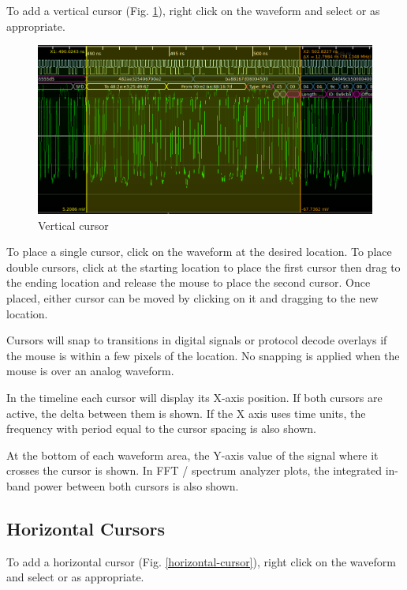 To add a vertical cursor (Fig. \ref{vertical-cursor}), right click on the waveform and select  or  as appropriate.

\begin{figure}[H]
\centering
\includegraphics[width=13cm]{images/vertical-cursor.png}
\caption{Vertical cursor}
\label{vertical-cursor}
\end{figure}

To place a single cursor, click on the waveform at the desired location. To place double cursors, click at the starting
location to place the first cursor then drag to the ending location and release the mouse to place the second cursor.
Once placed, either cursor can be moved by clicking on it and dragging to the new location.

Cursors will snap to transitions in digital signals or protocol decode overlays if the mouse is within a few pixels of
the location. No snapping is applied when the mouse is over an analog waveform.

In the timeline each cursor will display its X-axis position. If both cursors are active, the delta between them
is shown. If the X axis uses time units, the frequency with period equal to the cursor spacing is also shown.

At the bottom of each waveform area, the Y-axis value of the signal where it crosses the cursor is shown. In FFT /
spectrum analyzer plots, the integrated in-band power between both cursors is also shown.

\subsection{Horizontal Cursors}

To add a horizontal cursor (Fig. \ref{horizontal-cursor}), right click on the waveform and select  or  as appropriate.

